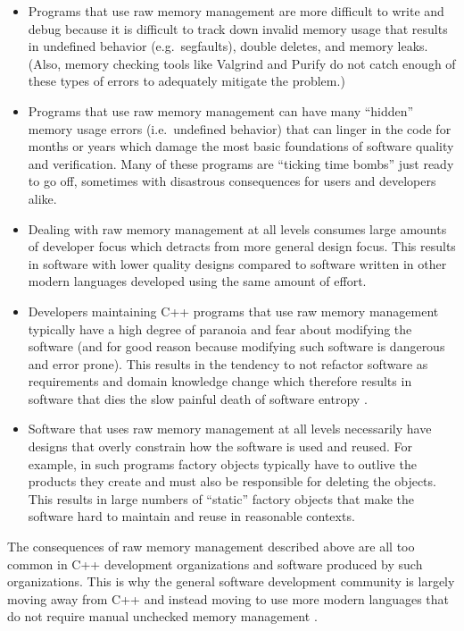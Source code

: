 \documentclass[pdf,ps2pdf,11pt]{SANDreport}
\begin{document}
\begin{itemize}

{}\item Programs that use raw memory management are more difficult to
write and debug because it is difficult to track down invalid memory
usage that results in undefined behavior (e.g.\ segfaults), double
deletes, and memory leaks.  (Also, memory checking tools like Valgrind
and Purify do not catch enough of these types of errors to adequately
mitigate the problem.)

{}\item Programs that use raw memory management can have many
``hidden'' memory usage errors (i.e.\ undefined behavior) that can
linger in the code for months or years which damage the most basic
foundations of software quality and verification.  Many of these
programs are ``ticking time bombs'' just ready to go off, sometimes
with disastrous consequences for users and developers alike.

{}\item Dealing with raw memory management at all levels consumes large
amounts of developer focus which detracts from more general design
focus.  This results in software with lower quality designs compared
to software written in other modern languages developed using the same
amount of effort.

{}\item Developers maintaining C++ programs that use raw memory
management typically have a high degree of paranoia and fear about
modifying the software (and for good reason because modifying such
software is dangerous and error prone).  This results in the tendency
to not refactor software as requirements and domain knowledge change
{}\cite{DomainDrivenDesign} which therefore results in software that
dies the slow painful death of software entropy
{}\cite{MythicalManMonth95}.

{}\item Software that uses raw memory management at all levels
necessarily have designs that overly constrain how the software is used
and reused.  For example, in such programs factory objects typically
have to outlive the products they create and must also be responsible
for deleting the objects.  This results in large numbers of ``static''
factory objects that make the software hard to maintain and reuse in
reasonable contexts.

\end{itemize}

The consequences of raw memory management described above are all too
common in C++ development organizations and software produced by such
organizations.  This is why the general software development community
is largely moving away from C++ and instead moving to use more modern
languages that do not require manual unchecked memory management
{}\cite{DomainDrivenDesignQuickly}.
\end{document}
